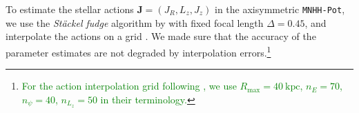 \documentclass[iop,revtex4,numberedappendix,appendixfloats]{emulateapj}
\newcommand{\vect}[1]{\boldsymbol{#1}}
\newcommand{\NEW}[1]{\textcolor{Green}{#1}}
\begin{document}
To estimate the stellar actions $\vect{J}=(J_R,L_z,J_z)$ in the axisymmetric \texttt{MNHH-Pot}, we use the \emph{St\"{a}ckel fudge} algorithm by \citet{2012MNRAS.426.1324B} with fixed focal length $\Delta=0.45$, and interpolate the actions on a grid \citep{2012MNRAS.426.1324B,2015ApJS..216...29B}. We made sure that the accuracy of the parameter estimates are not degraded by interpolation errors.\footnote{\NEW{For the action interpolation grid following \citet{2015ApJS..216...29B}, we use $R_\text{max}=40~\text{kpc}$, $n_E=70$, $n_\psi=40$, $n_{L_z}=50$ in their terminology.}}

\begin{figure}[!htbp]
  \centering

\end{figure}
\end{document}
